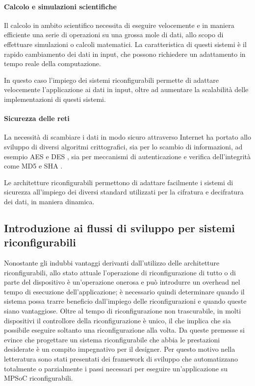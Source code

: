 \paragraph{Calcolo e simulazioni scientifiche}
Il calcolo in ambito scientifico necessita di eseguire velocemente e in maniera efficiente
una serie di operazioni su una grossa mole di dati, allo scopo di effettuare simulazioni o
calcoli matematici. La caratteristica di questi sistemi è il rapido cambiamento dei dati in
input, che possono richiedere un adattamento in tempo reale della computazione.

In questo caso l'impiego dei sistemi riconfigurabili permette di adattare velocemente
l'applicazione ai dati in input, oltre ad aumentare la scalabilità delle implementazioni
di questi sistemi.


\paragraph{Sicurezza delle reti}
La necessità di scambiare i dati in modo sicuro attraverso Internet ha portato allo sviluppo
di diversi algoritmi crittografici, sia per lo scambio di informazioni, ad esempio
\ac{AES} \cite{AESFPGA} e \ac{DES} \cite{DESFPGA}, sia per meccanismi di autenticazione e verifica dell'integrità come
MD5 \cite{MD5FPGA} e \ac{SHA} \cite{SHA256FPGA}.

Le architetture riconfigurabili permettono di adattare facilmente i sistemi di sicurezza
all'impiego dei diversi standard utilizzati per la cifratura e decifratura dei dati, in
maniera dinamica.


\subsection{Introduzione ai flussi di sviluppo per sistemi riconfigurabili}
\label{subsec:introFlussi}
Nonostante gli indubbi vantaggi derivanti dall'utilizzo delle architetture riconfigurabili,
allo stato attuale l'operazione di riconfigurazione di tutto o di parte del dispositivo \`e
un'operazione onerosa e pu\`o introdurre un overhead nel tempo di esecuzione dell'applicazione;
\`e necessario quindi determinare quando il sistema possa trarre beneficio dall'impiego delle
riconfigurazioni e quando queste siano vantaggiose. Oltre al tempo di riconfigurazione non trascurabile,
in molti dispositivi il controllore della riconfigurazione \`e unico, il che implica che sia possibile
eseguire soltanto una riconfigurazione alla volta.
Da queste premesse si evince che progettare un sistema riconfigurabile che abbia le prestazioni desiderate
\`e un compito impegnativo per il designer. Per questo motivo nella letteratura sono stati presentati dei framework
di sviluppo che automatizzano totalmente o parzialmente i passi necessari per eseguire un'applicazione
su MPSoC riconfigurabili.


